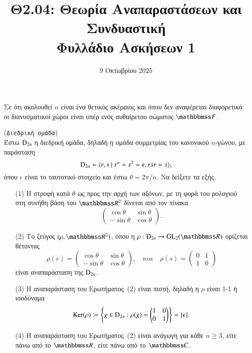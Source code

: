 \documentclass[12pt,a4paper,reqno]{amsart}
\title[]{Θ2.04: Θεωρία Αναπαραστάσεων και Συνδυαστική \\ Φυλλάδιο Ασκήσεων 1}
\date{9 Οκτωβρίου 2025}
\begin{document}
\begingroup
\def\uppercasenonmath#1{} %
\let\MakeUppercase\relax %
\maketitle
\endgroup

\setcounter{section}{1}
\thispagestyle{empty}

Σε ότι ακολουθεί $n$ είναι ένα θετικός ακέραιος και όπου δεν αναφέρεται διαφορετικά οι διανυσματικοί χώροι είναι υπέρ ενός αυθαίρετου σώματος $\FF$.

\begin{exercise}{(\texttt{Διεδρική ομάδα})}
    \\
    Έστω $\mathrm{D}_{2n}$ η διεδρική ομάδα, δηλαδή η ομάδα συμμετρίας του κανονικού $n$-γώνου, με παράσταση 
    \[
    \mathrm{D}_{2n} = \langle r, s \mid r^n = s^2 = \epsilon, rsr = s\rangle,
    \]
    όπου $\epsilon$ είναι το ταυτοτικό στοιχείο και έστω $\theta = 2\pi/n$. Να δείξετε τα εξής.
    \begin{itemize}
        \item[(1)] Η στροφή κατά $\theta$ ως προς την αρχή των αξόνων, με τη φορά του ρολογιού στη συνήθη βάση του $\RR^2$ δίνεται από τον πίνακα 
        \[
        \begin{pmatrix}
            \cos\theta  & \sin\theta \\
            -\sin\theta & \cos\theta
        \end{pmatrix}.
        \]
        \item[(2)] Το ζεύγος $(\rho, \RR^2)$, όπου η $\rho : \rmD_{2n} \to \GL_2(\RR)$ ορίζεται θέτοντας
        \[
        \rho(r) = 
        \begin{pmatrix}
            \cos\theta  & \sin\theta \\
            -\sin\theta & \cos\theta
        \end{pmatrix},
        \quad 
        \text{και}
        \quad 
        \rho(s) = 
        \begin{pmatrix}
            0 & 1 \\
            1 & 0
        \end{pmatrix}
        \]
        είναι αναπαράσταση της $\mathrm{D}_{2n}$.
        \item[(3)] Η αναπαράσταση του Ερωτήματος~(2) είναι πιστή, δηλαδή η $\rho$ είναι 1-1 ή ισοδύναμα 
        \[ 
        \mathrm{Ker}(\rho) \coloneqq \left\{g \in \mathrm{D}_{2n} : \rho(g) = 
        \begin{pmatrix}
            1 & 0 \\ 0 & 1 
        \end{pmatrix}\right\} 
        = \{\epsilon\}.
        \]
        \item[(4)] Η αναπαράσταση του Ερωτήματος~(2) είναι ανάγωγη για κάθε $n \ge 3$, είτε πάνω από το $\RR$, είτε πάνω από το $\CC$.
    \end{itemize}


\end{exercise}
\end{document}
